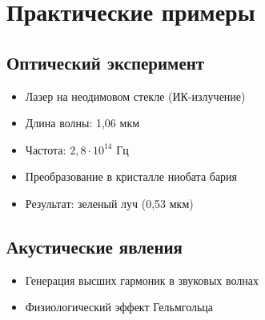 \documentclass[12pt]{article}
\begin{document}
\section{Практические примеры}

\subsection{Оптический эксперимент}
\begin{itemize}
    \item Лазер на неодимовом стекле (ИК-излучение)
    \item Длина волны: 1,06 мкм
    \item Частота: $2,8\cdot10^{14}$ Гц
    \item Преобразование в кристалле ниобата бария
    \item Результат: зеленый луч (0,53 мкм)
\end{itemize}

\subsection{Акустические явления}
\begin{itemize}
    \item Генерация высших гармоник в звуковых волнах
    \item Физиологический эффект Гельмгольца
\end{itemize}
\end{document}

